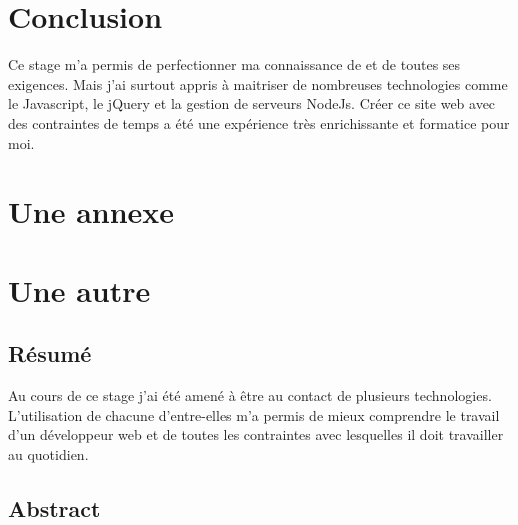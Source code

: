 \documentclass[a4paper, 11pt]{report}
\begin{document}
\chapter{Conclusion}
    Ce stage m'a permis de perfectionner ma connaissance de \symfony et de toutes ses exigences. Mais j'ai surtout appris à maitriser de nombreuses technologies comme le Javascript, le jQuery et la gestion de serveurs NodeJs. Créer ce site web avec des contraintes de temps a été une expérience très enrichissante et formatice pour moi.

\appendix
    \chapter{Une annexe}
    \chapter{Une autre}




\newpage
    \section*{Résumé}
    Au cours de ce stage j'ai été amené à être au contact de plusieurs technologies. L'utilisation de chacune d'entre-elles m'a permis de mieux comprendre le travail d'un développeur web et de toutes les contraintes avec lesquelles il doit travailler au quotidien.
    \section*{Abstract}
\end{document}
